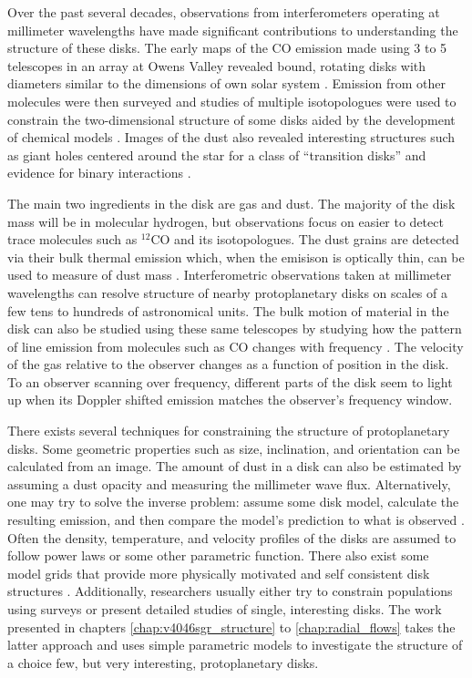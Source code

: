 Over the past several decades, observations from interferometers operating at millimeter wavelengths have made
significant contributions to understanding the structure of these disks.  The early maps of the CO emission
made using 3 to 5 telescopes in an array at Owens Valley revealed bound, rotating disks with diameters 
similar to the dimensions of own solar system \citep{sargent87,weintraub89,koerner93}.  Emission from other 
molecules were then surveyed \citep{dutrey97} and studies of multiple isotopologues were used to constrain the 
two-dimensional structure of some disks \citep{dartois03,pietu07,qi11} aided by the development of 
chemical models \citep{aikawa99,aikawa01}.  Images of the dust also revealed interesting structures such as
giant holes centered around the star for a class of ``transition disks'' \citep{hughes07,brown09,andrews11} and 
evidence for binary interactions \citep{akeson98}.


The main two ingredients in the disk are gas and dust.  The majority of the disk mass will be in molecular 
hydrogen, but observations focus on easier to detect trace molecules such as $^{12}$CO and its isotopologues.
The dust grains are detected via their bulk thermal emission which, when the emisison is optically thin,  
can be used to measure of dust mass \citep{hildebrand83}.  Interferometric observations taken at 
millimeter wavelengths can resolve structure of nearby protoplanetary disks on scales of a few tens to 
hundreds of astronomical units.  The bulk motion of material in the disk can also be 
studied using these same telescopes by studying how the pattern of line emission
from molecules such as CO changes with frequency \citep{beckwith93}.  The velocity of the gas relative to the 
observer changes as a function of position in the disk. To an observer scanning over frequency, different parts 
of the disk seem to light up when its Doppler shifted emission matches the observer's frequency window.

There exists several techniques for constraining the structure of protoplanetary disks.  Some geometric 
properties such as size, inclination, and orientation can be calculated from an image.  The amount of dust 
in a disk can also be estimated by assuming a dust opacity and measuring the millimeter wave flux.  
Alternatively, one may try to solve the inverse problem: assume some disk model, calculate the resulting 
emission, and then compare the model's prediction to what is observed \citep[i.e.][]{dartois03,qi03}.  Often the 
density, temperature, and velocity profiles of the disks are assumed to 
follow power laws or some other parametric function.  There also exist some model grids that provide more
physically motivated and self consistent disk structures \citep{dalessio05,woitke10}.  Additionally, researchers 
usually either try to constrain populations using 
surveys \citep[i.e.][]{andrews11,oberg11,harris12} or present detailed studies of single, 
interesting disks.  The work
presented in chapters \ref{chap:v4046sgr_structure} to \ref{chap:radial_flows} takes the latter approach and 
uses simple parametric 
models to investigate the structure of a choice few, but very interesting, protoplanetary disks.

